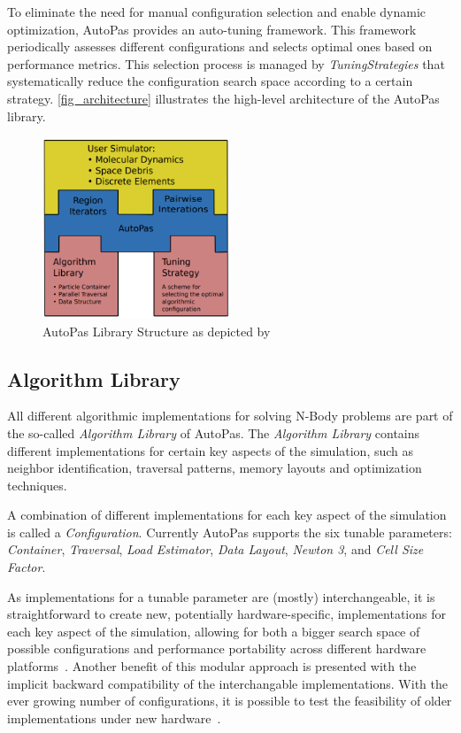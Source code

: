 \documentclass[conference]{IEEEtran}
\begin{document}
To eliminate the need for manual configuration selection and enable dynamic optimization, AutoPas provides an auto-tuning framework. This framework periodically assesses different configurations and selects optimal ones based on performance metrics. This selection process is managed by \textit{TuningStrategies} that systematically reduce the configuration search space according to a certain strategy. \autoref{fig_architecture} illustrates the high-level architecture of the AutoPas library.

\begin{figure}[H]
    \centering
    \includegraphics[width=2.2in]{figures/AutoPasLibraryStructure.png}
    \caption{AutoPas Library Structure as depicted by~\cite{Newcome2023Poster}}
    \label{fig_architecture}
\end{figure}

\subsection{Algorithm Library}

All different algorithmic implementations for solving N-Body problems are part of the so-called \textit{Algorithm Library} of AutoPas. The \textit{Algorithm Library} contains different implementations for certain key aspects of the simulation, such as neighbor identification, traversal patterns, memory layouts and optimization techniques.

A combination of different implementations for each key aspect of the simulation is called a \textit{Configuration}. Currently AutoPas supports the six tunable parameters: \textit{Container}, \textit{Traversal}, \textit{Load Estimator}, \textit{Data Layout}, \textit{Newton 3}, and \textit{Cell Size Factor}.

As implementations for a tunable parameter are (mostly) interchangeable, it is straightforward to create new, potentially hardware-specific, implementations for each key aspect of the simulation, allowing for both a bigger search space of possible configurations and performance portability across different hardware platforms~\cite{Tchipev2020}. Another benefit of this modular approach is presented with the implicit backward compatibility of the interchangable implementations. With the ever growing number of configurations, it is possible to test the feasibility of older implementations under new hardware~\cite{Tchipev2020}.
\end{document}
